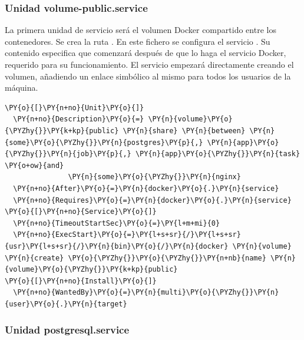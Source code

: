 \subsubsection{Unidad volume-public.service}

La primera unidad de servicio será el volumen Docker compartido entre los contenedores. Se crea la ruta . En este fichero se configura el servicio . Su contenido especifica que comenzará después de que lo haga el servicio Docker, requerido para su funcionamiento. El servicio empezará directamente creando el volumen, añadiendo un enlace simbólico al mismo para todos los usuarios de la máquina. 

\begin{codelisting}
\label{code:volume-public.service}
\begin{Verbatim}[fontsize=\relsize{-2.5},fontseries=b,commandchars=\\\{\}]
\PY{o}{[}\PY{n+no}{Unit}\PY{o}{]} 
  \PY{n+no}{Description}\PY{o}{=} \PY{n}{volume}\PY{o}{\PYZhy{}}\PY{k+kp}{public} \PY{n}{share} \PY{n}{between} \PY{n}{some}\PY{o}{\PYZhy{}}\PY{n}{postgres}\PY{p}{,} \PY{n}{app}\PY{o}{\PYZhy{}}\PY{n}{job}\PY{p}{,} \PY{n}{app}\PY{o}{\PYZhy{}}\PY{n}{task} \PY{o+ow}{and} 
               \PY{n}{some}\PY{o}{\PYZhy{}}\PY{n}{nginx} 
  \PY{n+no}{After}\PY{o}{=}\PY{n}{docker}\PY{o}{.}\PY{n}{service}
  \PY{n+no}{Requires}\PY{o}{=}\PY{n}{docker}\PY{o}{.}\PY{n}{service}
\PY{o}{[}\PY{n+no}{Service}\PY{o}{]} 
  \PY{n+no}{TimeoutStartSec}\PY{o}{=}\PY{l+m+mi}{0} 
  \PY{n+no}{ExecStart}\PY{o}{=}\PY{l+s+sr}{/}\PY{l+s+sr}{usr}\PY{l+s+sr}{/}\PY{n}{bin}\PY{o}{/}\PY{n}{docker} \PY{n}{volume} \PY{n}{create} \PY{o}{\PYZhy{}}\PY{o}{\PYZhy{}}\PY{n+nb}{name} \PY{n}{volume}\PY{o}{\PYZhy{}}\PY{k+kp}{public}
\PY{o}{[}\PY{n+no}{Install}\PY{o}{]} 
  \PY{n+no}{WantedBy}\PY{o}{=}\PY{n}{multi}\PY{o}{\PYZhy{}}\PY{n}{user}\PY{o}{.}\PY{n}{target}
\end{Verbatim}
\end{codelisting}

\subsubsection{Unidad postgresql.service}

